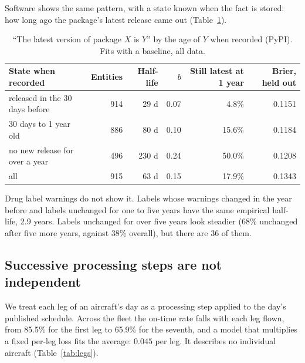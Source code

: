 Software shows the same pattern, with a state known when the fact is
stored: how long ago the package's latest release came out
(Table~\ref{tab:pypi}).

\begin{table}[t]
\centering
\small
\caption{``The latest version of package $X$ is $Y$'' by the age of $Y$ when
recorded (PyPI). Fits with a baseline, all data.}
\label{tab:pypi}
\begin{tabular}{lrrrrr}
\toprule
State when recorded & Entities & Half-life & $b$ & Still latest at 1 year & Brier, held out \\
\midrule
released in the 30 days before & 914 & 29 d & 0.07 & 4.8\% & 0.1151 \\
30 days to 1 year old & 886 & 80 d & 0.10 & 15.6\% & 0.1184 \\
no new release for over a year & 496 & 230 d & 0.24 & 50.0\% & 0.1208 \\
all & 915 & 63 d & 0.15 & 17.9\% & 0.1343 \\
\bottomrule
\end{tabular}
\end{table}

Drug label warnings do not show it. Labels whose warnings changed in the
year before and labels unchanged for one to five years have the same
empirical half-life, 2.9 years. Labels unchanged for over five years look
steadier (68\% unchanged after five more years, against 38\% overall), but
there are 36 of them.

\subsection{Successive processing steps are not independent}\label{sec:results-steps}

We treat each leg of an aircraft's day as a processing step applied to the
day's published schedule. Across the fleet the on-time rate falls with each
leg flown, from 85.5\% for the first leg to 65.9\% for the seventh, and a
model that multiplies a fixed per-leg loss fits the average: $0.045$ per
leg. It describes no individual aircraft (Table~\ref{tab:legs}).

